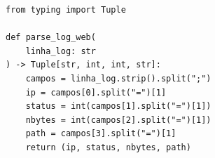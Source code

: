 \ifmostrarGabarito
\begin{verbatim}
from typing import Tuple

def parse_log_web(
    linha_log: str
) -> Tuple[str, int, int, str]:
    campos = linha_log.strip().split(";")
    ip = campos[0].split("=")[1]
    status = int(campos[1].split("=")[1])
    nbytes = int(campos[2].split("=")[1])
    path = campos[3].split("=")[1]
    return (ip, status, nbytes, path)
\end{verbatim}

\fi

